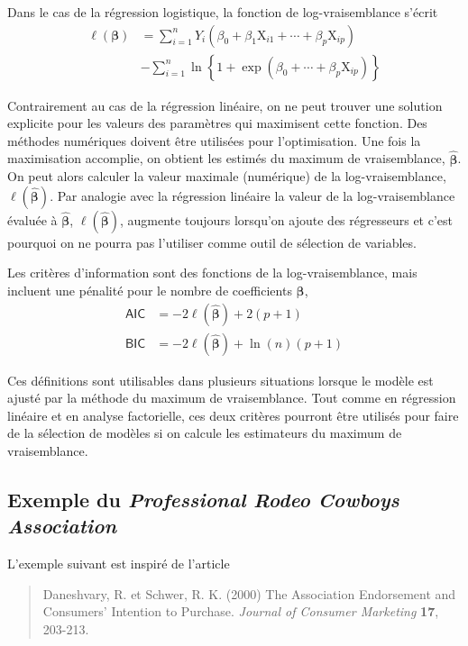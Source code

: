 \documentclass[
  11pt,
  letterpaper,
]{book}
\theoremstyle{definition}
\theoremstyle{remark}
\begin{document}
Dans le cas de la régression logistique, la fonction de
log-vraisemblance s'écrit \begin{align*}
 \ell(\boldsymbol{\beta}) &= \sum_{i=1}^n Y_i ( \beta_0 + \beta_1 \mathrm{X}_{i1} + \cdots + \beta_p \mathrm{X}_{ip}) \\&- \sum_{i=1}^n \ln\left\{1+\exp(\beta_0 + \cdots + \beta_p\mathrm{X}_{ip})\right\}
\end{align*}

Contrairement au cas de la régression linéaire, on ne peut trouver une
solution explicite pour les valeurs des paramètres qui maximisent cette
fonction. Des méthodes numériques doivent être utilisées pour
l'optimisation. Une fois la maximisation accomplie, on obtient les
estimés du maximum de vraisemblance, \(\widehat{\boldsymbol{\beta}}\).
On peut alors calculer la valeur maximale (numérique) de la
log-vraisemblance, \(\ell(\widehat{\boldsymbol{\beta}})\). Par analogie
avec la régression linéaire la valeur de la log-vraisemblance évaluée à
\(\widehat{\boldsymbol{\beta}}\),
\(\ell(\widehat{\boldsymbol{\beta}})\), augmente toujours lorsqu'on
ajoute des régresseurs et c'est pourquoi on ne pourra pas l'utiliser
comme outil de sélection de variables.

Les critères d'information sont des fonctions de la log-vraisemblance,
mais incluent une pénalité pour le nombre de coefficients
\(\boldsymbol{\beta}\), \begin{align*}
 \mathsf{AIC} & = -2 \ell(\widehat{\boldsymbol{\beta}}) + 2(p+1)\\
 \mathsf{BIC} & = -2 \ell(\widehat{\boldsymbol{\beta}}) + \ln(n)(p+1)
\end{align*}

Ces définitions sont utilisables dans plusieurs situations lorsque le
modèle est ajusté par la méthode du maximum de vraisemblance. Tout comme
en régression linéaire et en analyse factorielle, ces deux critères
pourront être utilisés pour faire de la sélection de modèles si on
calcule les estimateurs du maximum de vraisemblance.

\hypertarget{sec-cowboy}{%
\subsection{\texorpdfstring{Exemple du \emph{Professional Rodeo Cowboys
Association}}{Exemple du Professional Rodeo Cowboys Association}}\label{sec-cowboy}}

L'exemple suivant est inspiré de l'article

\begin{quote}
Daneshvary, R. et Schwer, R. K. (2000) The Association Endorsement and
Consumers' Intention to Purchase. \emph{Journal of Consumer Marketing}
\textbf{17}, 203-213.
\end{quote}
\end{document}

